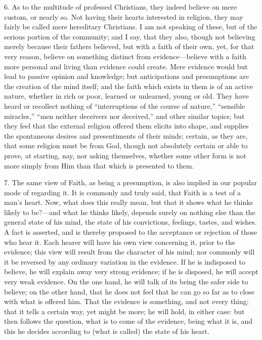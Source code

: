 6. As to the multitude of professed Christians, they indeed believe
on mere custom, or nearly so. Not having their hearts interested in
religion, they may fairly be called mere hereditary Christians. I am
not speaking of these, but of the serious portion of the community;
and I say, that they also, though not believing merely because their
fathers believed, but with a faith of their own, yet, for that very
reason, believe on something distinct from evidence—believe with a
faith more personal and living than evidence could create. Mere
evidence would but lead to passive opinion and knowledge; but
anticipations and presumptions are the creation of the mind itself;
and the faith which exists in them is of an active nature, whether in
rich or poor, learned or unlearned, young or old. They have heard or
recollect nothing of ``interruptions of the course of
nature,'' ``sensible miracles,'' ``men neither
deceivers nor deceived,'' and other similar topics; but they feel
that the external religion offered them elicits into shape, and
supplies the spontaneous desires and presentiments of their minds;
certain, as they are, that some religion must be from God, though not
absolutely certain or able to prove, at starting, nay, nor asking
themselves, whether some other form is not more simply from Him than
that which is presented to them.

7. The same view of Faith, as being a presumption, is also implied
in our popular mode of regarding it. It is commonly and truly said,
that Faith is a test of a man's heart. Now, what does this really
mean, but that it shows what he thinks likely to be?—and what he
thinks likely, depends surely on nothing else than the general state
of his mind, the state of his convictions, feelings, tastes, and
wishes. A fact is asserted, and is thereby proposed to the acceptance
or rejection of those who hear it. Each hearer will have his own view
concerning it, prior to the evidence; this view will result from the
character of his mind; nor commonly will it be reversed by any
ordinary variation in the evidence. If he is indisposed to believe, he
will explain away very strong evidence; if he is disposed, he will
accept very weak evidence. On the one hand, he will talk of its being
the safer side to believe; on the other hand, that he does not feel
that he can go so far as to close with what is offered him. That the
evidence is something, and not every thing; that it tells a certain
way, yet might be more; he will hold, in either case: but then follows
the question, what is to come of the evidence, being what it is, and
this he decides according to (what is called) the state of his heart.

